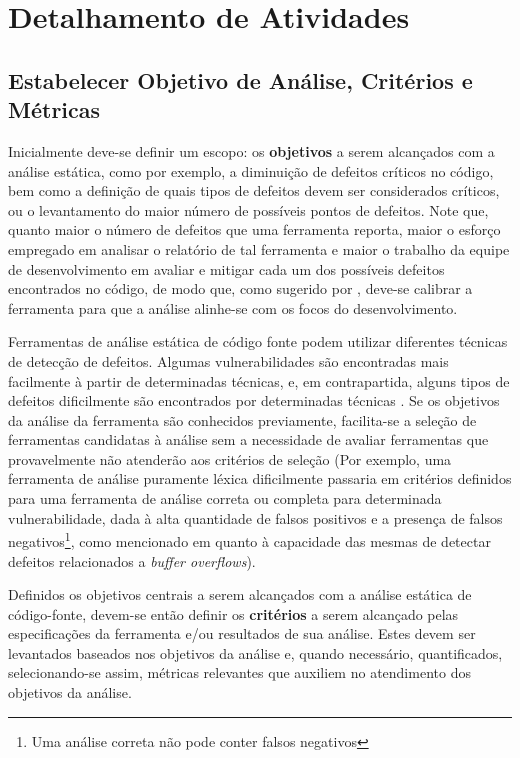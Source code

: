 \section{Detalhamento de Atividades}\label{metodologia_proposta:detalhamento_de_atividades}

\subsection{Estabelecer Objetivo de Análise, Critérios e Métricas}

Inicialmente deve-se definir um escopo: os \textbf{objetivos} a serem alcançados com a análise estática, como por exemplo, a diminuição de defeitos críticos no código, bem como a definição de quais tipos de defeitos devem ser considerados críticos, ou o levantamento do maior número de possíveis pontos de defeitos. Note que, quanto maior o número de defeitos que uma ferramenta reporta, maior o esforço empregado em analisar o relatório de tal ferramenta e maior o trabalho da equipe de desenvolvimento em avaliar e mitigar cada um dos possíveis defeitos encontrados no código, de modo que, como sugerido por \cite{seatbelts}, deve-se calibrar a ferramenta para que a análise alinhe-se com os focos do desenvolvimento.

Ferramentas de análise estática de código fonte podem utilizar diferentes técnicas de detecção de defeitos. Algumas vulnerabilidades são encontradas mais facilmente à partir de determinadas técnicas, e, em contrapartida, alguns tipos de defeitos dificilmente são encontrados por determinadas técnicas \cite{harvard}. Se os objetivos da análise da ferramenta são conhecidos previamente, facilita-se a seleção de ferramentas candidatas à análise sem a necessidade de avaliar ferramentas que provavelmente não atenderão aos critérios de seleção (Por exemplo, uma ferramenta de análise puramente léxica dificilmente passaria em critérios definidos para uma ferramenta de análise correta ou completa para determinada vulnerabilidade, dada à alta quantidade de falsos positivos e a presença de falsos negativos\footnote{Uma análise correta não pode conter falsos negativos}, como mencionado em \cite{harvard} quanto à capacidade das mesmas de detectar defeitos relacionados a \textit{buffer overflows}).

Definidos os objetivos centrais a serem alcançados com a análise estática de código-fonte, devem-se então definir os \textbf{critérios} a serem alcançado pelas especificações da ferramenta e/ou resultados de sua análise. Estes devem ser levantados baseados nos objetivos da análise e, quando necessário, quantificados, selecionando-se assim, métricas relevantes que auxiliem no atendimento dos objetivos da análise.

